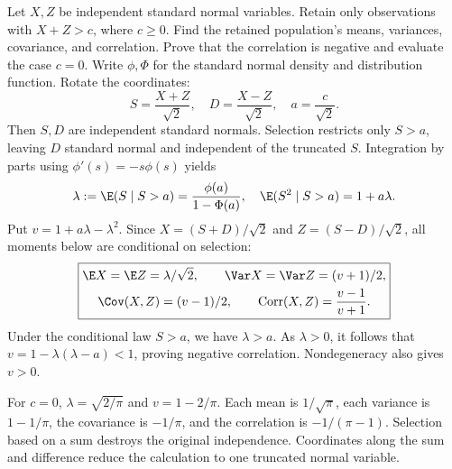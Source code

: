 Let $X,Z$ be independent standard normal variables. Retain only observations with $X+Z>c$, where $c\ge0$. Find the retained population's means, variances, covariance, and correlation. Prove that the correlation is negative and evaluate the case $c=0$. Write $\phi,\Phi$ for the standard normal density and distribution function.
\solution Rotate the coordinates:
\[
S=\frac{X+Z}{\sqrt2},\quad D=\frac{X-Z}{\sqrt2},
\quad a=\frac c{\sqrt2}.
\]
Then $S,D$ are independent standard normals. Selection restricts only $S>a$, leaving $D$ standard normal and independent of the truncated $S$. Integration by parts using $\phi'(s)=-s\phi(s)$ yields
\[
\lambda:=\E(S\mid S>a)=\frac{\phi(a)}{1-\Phi(a)},\quad
\E(S^2\mid S>a)=1+a\lambda.
\]
Put $v=1+a\lambda-\lambda^2$. Since $X=(S+D)/\sqrt2$ and $Z=(S-D)/\sqrt2$, all moments below are conditional on selection:
\[
\boxed{\begin{gathered}
\E X=\E Z=\lambda/\sqrt2,\qquad
\Var X=\Var Z=(v+1)/2,\\
\Cov(X,Z)=(v-1)/2,\qquad
\operatorname{Corr}(X,Z)=\frac{v-1}{v+1}.
\end{gathered}}
\]
Under the conditional law $S>a$, we have $\lambda>a$. As $\lambda>0$, it follows that $v=1-\lambda(\lambda-a)<1$, proving negative correlation. Nondegeneracy also gives $v>0$.

For $c=0$, $\lambda=\sqrt{2/\pi}$ and $v=1-2/\pi$. Each mean is $1/\sqrt\pi$, each variance is $1-1/\pi$, the covariance is $-1/\pi$, and the correlation is $-1/(\pi-1)$.
\insight Selection based on a sum destroys the original independence. Coordinates along the sum and difference reduce the calculation to one truncated normal variable.
